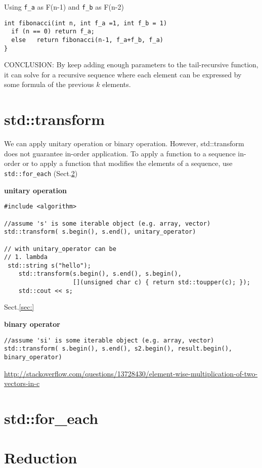 Using \verb!f_a! as F(n-1) and \verb!f_b! as F(n-2)
\begin{verbatim}
int fibonacci(int n, int f_a =1, int f_b = 1)
  if (n == 0) return f_a;
  else   return fibonacci(n-1, f_a+f_b, f_a)
}
\end{verbatim}

CONCLUSION: By keep adding enough parameters to the tail-recursive function, it
can solve for a recursive sequence where each element can be expressed by some
formula of the previous $k$ elements.

\section{std::transform}
\label{sec:std::transform}

We can apply unitary operation or binary operation.
However, std::transform does not guarantee in-order application.
To apply a function to a sequence in-order or to apply a function that modifies
the elements of a sequence, use \verb!std::for_each!
(Sect.\ref{sec:std::for_each})

{\bf unitary operation}
\begin{verbatim}
#include <algorithm>

//assume 's' is some iterable object (e.g. array, vector)
std::transform( s.begin(), s.end(), unitary_operator)

// with unitary_operator can be
// 1. lambda
 std::string s("hello");
    std::transform(s.begin(), s.end(), s.begin(),
                   [](unsigned char c) { return std::toupper(c); });
    std::cout << s;
\end{verbatim}
Sect.\ref{sec:}

{\bf binary operator}
\begin{lstlisting}
//assume 'si' is some iterable object (e.g. array, vector)
std::transform( s.begin(), s.end(), s2.begin(), result.begin(), binary_operator)
\end{lstlisting}
\url{http://stackoverflow.com/questions/13728430/element-wise-multiplication-of-two-vectors-in-c}

\section{std::for\_each}
\label{sec:std::for_each}

\section{Reduction}

